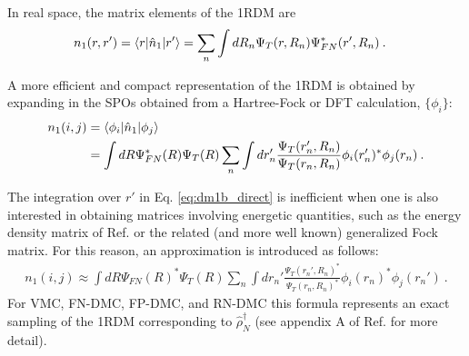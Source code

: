 In real space, the matrix elements of the 1RDM are
\begin{align}
  n_1(r,r') &= \expval{r}{\hat{n}_1}{r'} = \sum_n\int dR_n \Psi_T(r,R_n)\Psi_{FN}^*(r',R_n)\:. 
\end{align}

A more efficient and compact representation of the 1RDM is obtained by expanding in the SPOs obtained from a Hartree-Fock or DFT calculation, $\{\phi_i\}$:
\begin{align}\label{eq:dm1b_direct}
  n_1(i,j) &= \expval{\phi_i}{\hat{n}_1}{\phi_j} \nonumber \\
           &= \int dR \Psi_{FN}^*(R)\Psi_{T}(R) \sum_n\int dr'_n \frac{\Psi_T(r_n',R_n)}{\Psi_T(r_n,R_n)}\phi_i(r_n')^* \phi_j(r_n)\:.
\end{align} 

The integration over $r'$ in Eq. \ref{eq:dm1b_direct} is inefficient when one is also interested in obtaining matrices involving energetic quantities, such as the energy density matrix of Ref. \cite{Krogel2014} or the related (and more well known) generalized Fock matrix.  For this reason, an approximation is introduced as follows:
\begin{align}
    n_1(i,j) \approx \int dR \Psi_{FN}(R)^*\Psi_T(R)  \sum_n \int dr_n' \frac{\Psi_T(r_n',R_n)^*}{\Psi_T(r_n,R_n)^*}\phi_i(r_n)^* \phi_j(r_n')\:. 
\end{align}
For VMC, FN-DMC, FP-DMC, and RN-DMC this formula represents an exact sampling of the 1RDM corresponding to $\hat{\rho}_N^\dagger$ (see appendix A of Ref. \cite{Krogel2014} for more detail).




